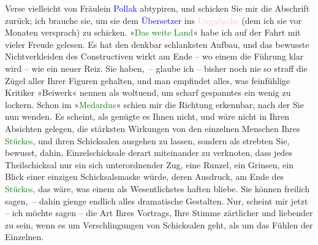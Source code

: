                Verse vielleicht von Fräulein \textcolor{blue}{Pollak}{}\ledrightnote{\textcolor{blue}{Frieda Pollak}} abtypiren,
               und schicken Sie mir die Abschrift zurück; ich brauche sie, um sie dem \textcolor{blue}{Übersetzer}{} ins \textcolor{pink}{Ungarische}{}\ledrightnote{\textcolor{pink}{Ungarn}} (dem ich sie vor Monaten versprach) zu schicken.\pend
           \pstart
           »\textcolor{green}{Das weite Land}{}\ledrightnote{\textcolor{green}{Das weite Land. Tragikomödie in fünf Akten}}« habe ich auf der Fahrt mit vieler
               Freude gelesen. Es hat den denkbar schlanksten Aufbau, und das bewusste
               Nichtverkleiden des Constructiven wirkt am Ende – wo einem die Führung klar wird –
               wie ein neuer Reiz. Sie haben, – glaube ich – bisher noch nie so straff die Zügel
               aller Ihrer {\pb}Figuren gehalten, und
               man empfindet alles, was feinfühlige Kritiker »Beiwerk« nennen als woltuend, um
               scharf gespanntes ein wenig zu lockern. Schon im »\textcolor{green}{Medardus}{}\ledrightnote{\textcolor{green}{Der junge Medardus. Dramatische Historie in einem Vorspiel und fünf Aufzügen}}« schien mir die Richtung erkennbar, nach der Sie \label{T_L01942-1v}\label{T_L01942-1h} nun wenden.\pend
           \pstart
           Es scheint, als genügte es Ihnen nicht, und wäre nicht in Ihren Absichten gelegen,
               die stärksten Wirkungen von den einzelnen Menschen Ihres \textcolor{green}{Stückes}{}, und ihren Schicksalen ausgehen zu lassen, sondern
               als strebten Sie, bewusst, dahin, Einzelschicksale derart miteinander zu verknoten,
               dass jedes Theilschicksal nur ein sich unterordnender Zug, eine Runzel, ein Grinsen,
               ein Blick einer einzigen Schicksalsmaske würde, deren Ausdruck, am Ende des \textcolor{green}{Stückes}{},
               das wäre, was einem als Wesentlichstes haften bliebe. {\pb}Sie können freilich sagen, – dahin
               gienge endlich alles dramatische Gestalten. Nur, scheint mir jetzt – ich möchte sagen
               – die Art Ihres Vortrags, Ihre Stimme zärtlicher und liebender zu sein, wenn es um
               Verschlingungen von Schicksalen geht, als um das Fühlen der Einzelnen.\pend
           \pstart
